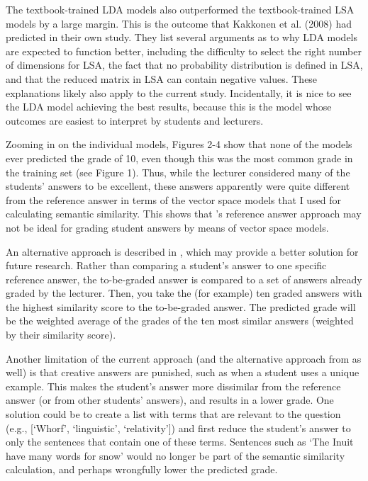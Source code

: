 \documentclass[a4paper,10pt,twoside]{article}
\begin{document}
The textbook-trained LDA models also outperformed the textbook-trained LSA models by a large margin. This is the outcome that Kakkonen et al. (2008) had predicted in their own study. They list several arguments as to why LDA models are expected to function better, including the difficulty to select the right number of dimensions for LSA, the fact that no probability distribution is defined in LSA, and that the reduced matrix in LSA can contain negative values. These explanations likely also apply to the current study. Incidentally, it is nice to see the LDA model achieving the best results, because this is the model whose outcomes are easiest to interpret by students and lecturers.

Zooming in on the individual models, Figures 2-4 show that none of the models ever predicted the grade of 10, even though this was the most common grade in the training set (see Figure 1). Thus, while the lecturer considered many of the students’ answers to be excellent, these answers apparently were quite different from the reference answer in terms of the vector space models that I used for calculating semantic similarity. This shows that \cite{wolfe1998}'s reference answer approach may not be ideal for grading student answers by means of vector space models.

An alternative approach is described in \cite{foltz1998}, which may provide a better solution for future research. Rather than comparing a student's answer to one specific reference answer, the to-be-graded answer is compared to a set of answers already graded by the lecturer. Then, you take the (for example) ten graded answers with the highest similarity score to the to-be-graded answer. The predicted grade will be the weighted average of the grades of the ten most similar answers (weighted by their similarity score).

Another limitation of the current approach (and the alternative approach from \cite{foltz1998} as well) is that creative answers are punished, such as when a student uses a unique example. This makes the student’s answer more dissimilar from the reference answer (or from other students’ answers), and results in a lower grade. One solution could be to create a list with terms that are relevant to the question (e.g., [`Whorf', `linguistic', `relativity']) and first reduce the student’s answer to only the sentences that contain one of these terms. Sentences such as ‘The Inuit have many words for snow’ would no longer be part of the semantic similarity calculation, and perhaps wrongfully lower the predicted grade.
\end{document}
